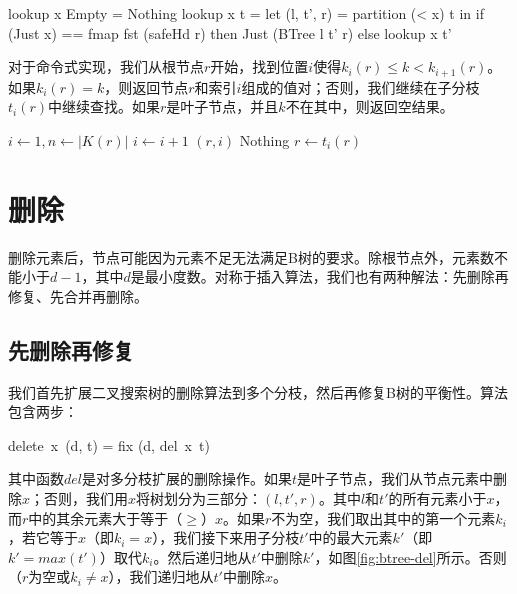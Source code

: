 \documentclass[b5paper]{ctexart}
\begin{document}
\begin{Haskell}
lookup x Empty = Nothing
lookup x t = let (l, t', r) = partition (< x) t in
  if (Just x) == fmap fst (safeHd r) then Just (BTree l t' r)
  else lookup x t'
\end{Haskell}

对于命令式实现，我们从根节点$r$开始，找到位置$i$使得$k_i(r) \leq k < k_{i+1}(r)$。如果$k_i(r) = k$，则返回节点$r$和索引$i$组成的值对；否则，我们继续在子分枝$t_i(r)$中继续查找。如果$r$是叶子节点，并且$k$不在其中，则返回空结果。

\begin{algorithmic}[1]
  \Loop
    \State $i \gets 1, n \gets |K(r)|$
      \State $i \gets i + 1$
    \EndWhile
      \State \Return $(r, i)$
    \EndIf
      \State \Return Nothing 
    \Else
      \State $r \gets t_i(r)$ 
    \EndIf
  \EndLoop
\EndFunction
\end{algorithmic}

\begin{Exercise}
\end{Exercise}

\section{删除}

删除元素后，节点可能因为元素不足无法满足B树的要求。除根节点外，元素数不能小于$d - 1$，其中$d$是最小度数。对称于插入算法，我们也有两种解法：先删除再修复、先合并再删除。

\subsection{先删除再修复}

我们首先扩展二叉搜索树的删除算法到多个分枝，然后再修复B树的平衡性。算法包含两步：

\be
delete\ x\ (d, t) = fix (d, del\ x\ t)
\ee

其中函数$del$是对多分枝扩展的删除操作。如果$t$是叶子节点，我们从节点元素中删除$x$；否则，我们用$x$将树划分为三部分：$(l, t', r)$。其中$l$和$t'$的所有元素小于$x$，而$r$中的其余元素大于等于（$\geq$）$x$。如果$r$不为空，我们取出其中的第一个元素$k_i$，若它等于$x$（即$k_i = x$），我们接下来用子分枝$t'$中的最大元素$k'$（即$k' = max(t')$）取代$k_i$。然后递归地从$t'$中删除$k'$，如图\cref{fig:btree-del}所示。否则（$r$为空或$k_i \neq x$），我们递归地从$t'$中删除$x$。
\end{document}
